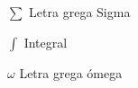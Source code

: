 
\begin{simbolos}
  \item[$ \sum  $] Letra grega Sigma
  \item[$ \int $] Integral
  \item[$ \omega $] Letra grega ómega
\end{simbolos}

